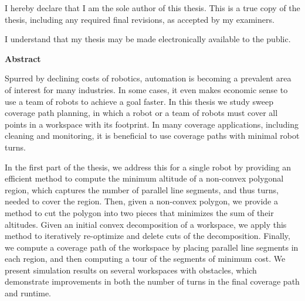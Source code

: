 \cleardoublepage %
 


  \noindent
I hereby declare that I am the sole author of this thesis. This is a true copy of the thesis, including any required final revisions, as accepted by my examiners.

  \bigskip
  
  \noindent
I understand that my thesis may be made electronically available to the public.

\cleardoublepage


\begin{center}\textbf{Abstract}\end{center}

Spurred by declining costs of robotics, automation is becoming a prevalent area of interest for many industries. In some cases, it even makes economic sense to use a team of robots to achieve a goal faster. In this thesis we study sweep coverage path planning, in which a robot or a team of robots must cover all points in a workspace with its footprint. In many coverage applications, including cleaning and monitoring, it is beneficial to use coverage paths with minimal robot turns.

In the first part of the thesis, we address this for a single robot by providing an efficient method to compute the minimum altitude of a non-convex polygonal region, which captures the number of parallel line segments, and thus turns, needed to cover the region. Then, given a non-convex polygon, we provide a method to cut the polygon into two pieces that minimizes the sum of their altitudes. Given an initial convex decomposition of a workspace, we apply this method to iteratively re-optimize and delete cuts of the decomposition. Finally, we compute a coverage path of the workspace by placing parallel line segments in each region, and then computing a tour of the segments of minimum cost. We present simulation results on several workspaces with obstacles, which demonstrate improvements in both the number of turns in the final coverage path and runtime.

